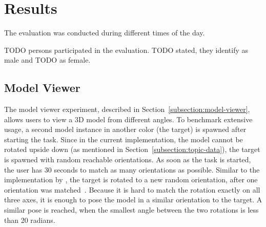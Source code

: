 \section{Results}\label{section:eval-results}


\newcommand{\evalExpMvAvgPoses}{3.255} %
\newcommand{\evalExpMvStdPoses}{2.284}
\newcommand{\evalExpMvParticipants}{12}

\newcommand{\kammAvgHits}{36.23/60}
\newcommand{\kammAvgStd}{6.87/60}
\newcommand{\pietAvgHits}{2.60}
\newcommand{\pietAvgStd}{0.734}
\newcommand{\oursAvgHits}{32/30}
\newcommand{\oursAvgStd}{2/30}

\newcommand{\evalExpMvSusScore}{82}
\newcommand{\evalExpMvSusGrade}{B}
\newcommand{\evalExpMvSusAdj}{Good}

\newcommand{\evalExpLpSusScore}{82}
\newcommand{\evalExpLpSusGrade}{B}
\newcommand{\evalExpLpSusAdj}{Good}

\newcommand{\evalExpVkSusScore}{82}
\newcommand{\evalExpVkSusGrade}{B}
\newcommand{\evalExpVkSusAdj}{Good}





The evaluation was conducted during different times of the day. %


TODO persons participated in the evaluation. TODO stated, they identify as male and TODO as female. 

\subsection{Model Viewer}\label{section:eval-res-mv}

The model viewer experiment, described in Section~\ref{subsection:model-viewer}, allows users to view a \ac{3D} model from different angles. To benchmark extensive usage, a second model instance in another color (the target) is spawned after starting the task. Since in the current implementation, the model cannot be rotated upside down (as mentioned in Section~\ref{subsection:topic-data}), the target is spawned with random reachable orientations.
As soon as the task is started, the user has 30 seconds to match as many orientations as possible. Similar to the implementation by \citeauthor{Katzakis.2010}, the target is rotated to a new random orientation, after one orientation was matched~\cite[140]{Katzakis.2010}.
Because it is hard to match the rotation exactly on all three axes, it is enough to pose the model in a similar orientation to the target. A similar pose is reached, when the smallest angle between the two rotations is less than 20 radians.

